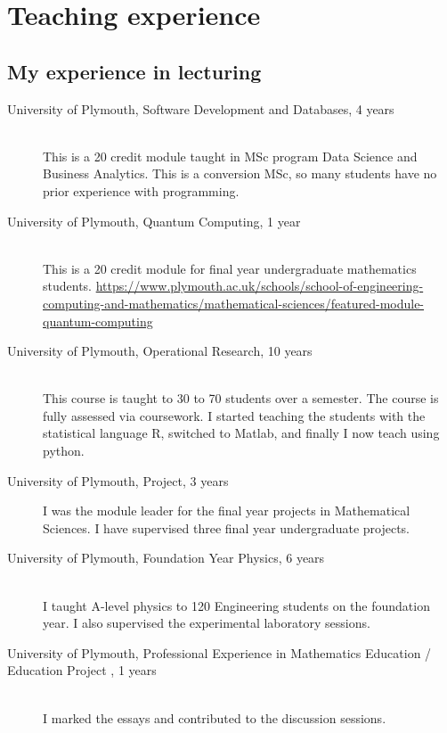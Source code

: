 \documentclass[12pt]{article}
\begin{document}
\FloatBarrier

%
\section{Teaching experience}

\subsection{My experience in lecturing}


\begin{description}

 \item[University of Plymouth, 
Software Development and Databases,
4 years]\hfill \\ This is a 20 credit module taught in
MSc program Data Science and Business Analytics. This is a conversion
MSc, so many students have no prior experience with programming.


 \item[University of Plymouth, 
Quantum Computing,
1 year]\hfill \\ This is a 20 credit module for final
   year undergraduate mathematics students. \url{https://www.plymouth.ac.uk/schools/school-of-engineering-computing-and-mathematics/mathematical-sciences/featured-module-quantum-computing}

  \item[University of Plymouth, Operational Research,
10 years] \hfill \\
This course is taught to  30 to 70 students over a semester. The course is fully
assessed via coursework. I started teaching the students with the statistical language R, switched 
to Matlab, and finally I now teach using python.

\item[University of Plymouth, Project, 3 years] I was the module leader
for the final year projects in Mathematical Sciences. I have
supervised three final year undergraduate projects.


  \item[University of Plymouth, Foundation Year Physics,
6 years] \hfill \\
I taught A-level physics to 120 Engineering students
on the foundation year. I also supervised the experimental 
laboratory sessions.

\item[University of Plymouth, Professional Experience in Mathematics
  Education / Education Project ,
1 years] \hfill \\
I marked the essays and contributed to the discussion sessions.


\end{description}
\end{document}
